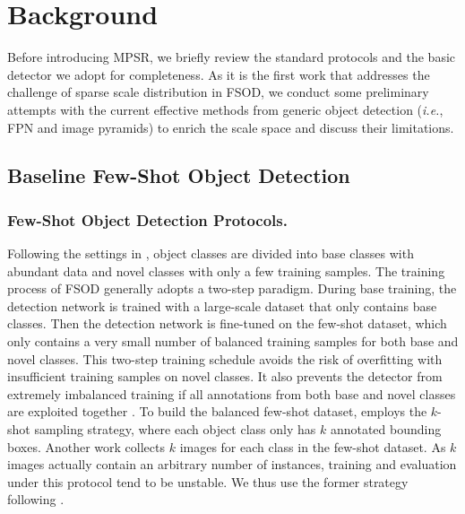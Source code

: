 \documentclass[runningheads]{llncs}
\begin{document}
\section{Background}
Before introducing MPSR, we briefly review the standard protocols and the basic detector we adopt for completeness. As it is the first work that addresses the challenge of sparse scale distribution in FSOD, we conduct some preliminary attempts with the current effective methods from generic object detection (\emph{i.e.}, FPN and image pyramids) to enrich the scale space and discuss their limitations.

\subsection{Baseline Few-Shot Object Detection}

\subsubsection{Few-Shot Object Detection Protocols.}
Following the settings in \cite{yolore,metarcnn}, object classes are divided into base classes with abundant data and novel classes with only a few training samples.
The training process of FSOD generally adopts a two-step paradigm. During base training, the detection network is trained with a large-scale dataset that only contains base classes. 
Then the detection network is fine-tuned on the few-shot dataset, which only contains a very small number of balanced  training samples for both base and novel classes.
This two-step training schedule avoids the risk of overfitting with insufficient training samples on novel classes. 
It also prevents the detector from extremely imbalanced training if all annotations from both base and novel classes are exploited together \cite{metarcnn}.
To build the balanced few-shot dataset, \cite{yolore} employs the $k$-shot sampling strategy, where each object class only has $k$ annotated bounding boxes.
Another work \cite{lstd} collects $k$ images for each class in the few-shot dataset. 
As $k$ images actually contain an arbitrary number of instances, training and evaluation under this protocol tend to be unstable. 
We thus use the former strategy following \cite{yolore}.
\end{document}
